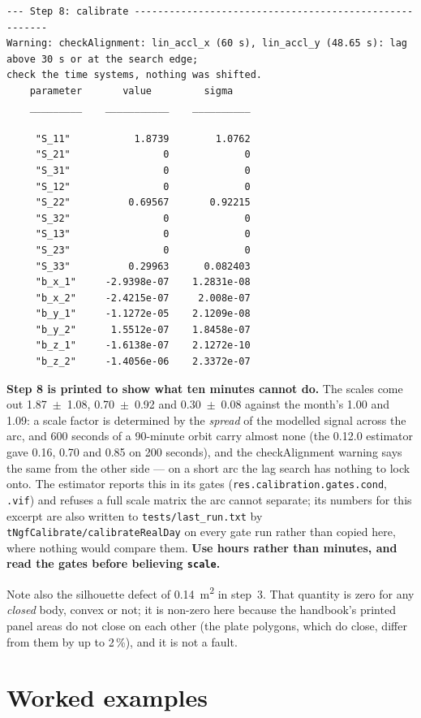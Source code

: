 \documentclass[11pt,a4paper]{report}
\begin{document}
\begin{lstlisting}
--- Step 8: calibrate -------------------------------------------------------
Warning: checkAlignment: lin_accl_x (60 s), lin_accl_y (48.65 s): lag above 30 s or at the search edge;
check the time systems, nothing was shifted.
    parameter       value         sigma
    _________    ___________    __________

     "S_11"           1.8739        1.0762
     "S_21"                0             0
     "S_31"                0             0
     "S_12"                0             0
     "S_22"          0.69567       0.92215
     "S_32"                0             0
     "S_13"                0             0
     "S_23"                0             0
     "S_33"          0.29963      0.082403
     "b_x_1"     -2.9398e-07    1.2831e-08
     "b_x_2"     -2.4215e-07     2.008e-07
     "b_y_1"     -1.1272e-05    2.1209e-08
     "b_y_2"      1.5512e-07    1.8458e-07
     "b_z_1"     -1.6138e-07    2.1272e-10
     "b_z_2"     -1.4056e-06    2.3372e-07
\end{lstlisting}

\noindent \textbf{Step 8 is printed to show what ten minutes cannot do.} The scales come out
1.87~$\pm$~1.08, 0.70~$\pm$~0.92 and 0.30~$\pm$~0.08 against the month's 1.00 and 1.09: a scale factor
is determined by the \emph{spread} of the modelled signal across the arc, and 600 seconds of a
90-minute orbit carry almost none (the 0.12.0 estimator gave 0.16, 0.70 and 0.85 on 200 seconds), and
the checkAlignment warning says the same from the other side --- on a short arc the lag search has
nothing to lock onto. The estimator reports this in its gates (\texttt{res.calibration.gates.cond},
\texttt{.vif}) and refuses a full scale matrix the arc cannot separate; its numbers for this excerpt
are also written to
\texttt{tests/last\_run.txt} by \texttt{tNgfCalibrate/calibrateRealDay} on every gate run rather
than copied here, where nothing would compare them. \textbf{Use hours rather than minutes, and read
the gates before believing \texttt{scale}.}

Note also the silhouette defect of \SI{0.14}{\metre\squared} in step~3. That quantity is zero for
any \emph{closed} body, convex or not; it is non-zero here because the handbook's printed panel
areas do not close on each other (the plate polygons, which do close, differ from them by up to
2\,\%), and it is not a fault.
\chapter{Worked examples}
\label{ch:examples}
\end{document}
